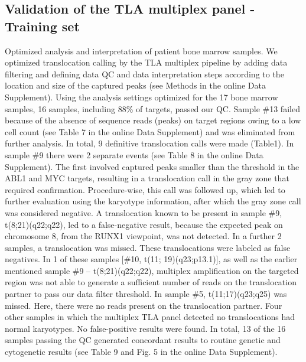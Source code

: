 \subsection{Validation of the TLA multiplex panel - Training set}
Optimized analysis and interpretation of patient bone marrow samples. 
We optimized translocation calling by the TLA multiplex pipeline by adding data filtering and defining data QC and data interpretation steps according to the location and size of the captured peaks (see Methods in the online Data Supplement). 
Using the analysis settings optimized for the 17 bone marrow samples, 16 samples, including 88\% of targets, passed our QC. 
Sample \#13 failed because of the absence of sequence reads (peaks) on target regions owing to a low cell count (see Table 7 in the online Data Supplement) and was eliminated from further analysis. 
In total, 9 definitive translocation calls were made (Table1). In sample \#9 there were 2 separate events (see Table 8 in the online Data Supplement).
The first involved captured peaks smaller than the threshold in the ABL1 and MYC targets, resulting in a translocation call in the gray zone that required confirmation. 
Procedure-wise, this call was followed up, which led to further evaluation using the karyotype information, after which the gray zone call was considered negative. 
A translocation known to be present in sample \#9, t(8;21)(q22;q22), led to a false-negative result, because the expected peak on chromosome 8, from the RUNX1 viewpoint, was not detected. 
In a further 2 samples, a translocation was missed. 
These translocations were labeled as false negatives. 
In 1 of these samples [\#10, t(11; 19)(q23;p13.1)], as well as the earlier mentioned sample \#9 -- t(8;21)(q22;q22), multiplex amplification on the targeted region was not able to generate a sufficient number of reads on the translocation partner to pass our data filter threshold. 
In sample \#5, t(11;17)(q23;q25) was missed.
Here, there were no reads present on the translocation partner. 
Four other samples in which the multiplex TLA panel detected no translocations had normal karyotypes. 
No false-positive results were found.
In total, 13 of the 16 samples passing the QC generated concordant results to routine genetic and cytogenetic results (see Table 9 and Fig. 5 in the online Data Supplement).

